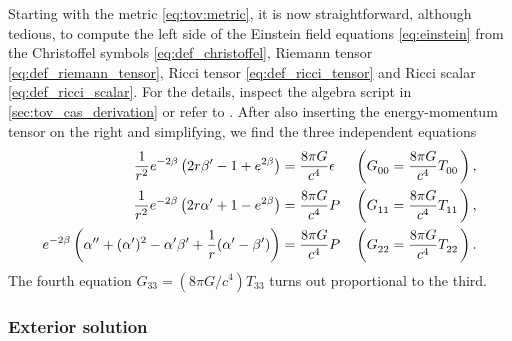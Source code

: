 Starting with the metric \eqref{eq:tov:metric}, it is now straightforward, although tedious, to compute the left side of the Einstein field equations \eqref{eq:einstein} from the Christoffel symbols \eqref{eq:def_christoffel}, Riemann tensor \eqref{eq:def_riemann_tensor}, Ricci tensor \eqref{eq:def_ricci_tensor} and Ricci scalar \eqref{eq:def_ricci_scalar}.
For the details, inspect the algebra script in \cref{sec:tov_cas_derivation} or refer to \cite[equation 5.11-5.15]{ref:carroll}.
After also inserting the energy-momentum tensor on the right and simplifying, we find the three independent equations
\begin{subequations}
\begin{align}
	\frac{1}{r^2} e^{-2 \beta} \left( 2 r \beta' - 1 + e^{2 \beta} \right)                               &= \frac{8 \pi G}{c^4} \epsilon
	&& \left( G\indices{_0_0} = \frac{8 \pi G}{c^4} T\indices{_0_0} \right) , \label{eq:einstein_to_tov:tt} \\
	\frac{1}{r^2} e^{-2 \beta} \left( 2 r \alpha' + 1 - e^{2 \beta} \right)                              &= \frac{8 \pi G}{c^4} P
	&& \left( G\indices{_1_1} = \frac{8 \pi G}{c^4} T\indices{_1_1} \right) , \label{eq:einstein_to_tov:rr} \\
	e^{-2 \beta} \left( \alpha'' + (\alpha')^2 - \alpha' \beta' + \frac{1}{r} (\alpha' - \beta') \right) &= \frac{8 \pi G}{c^4} P
	&& \left( G\indices{_2_2} = \frac{8 \pi G}{c^4} T\indices{_2_2} \right) . \label{eq:einstein_to_tov:thetatheta}
\end{align}
\label{eq:einstein_to_tov:einstein_equation_in_star}
\end{subequations}
The fourth equation $G_{33} = (8 \pi G / c^4 ) T_{33}$ turns out proportional to the third.

\subsubsection{Exterior solution}

